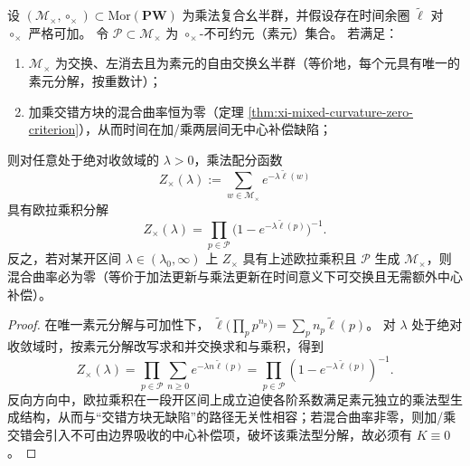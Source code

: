 \begin{theorem}\label{thm:xi-time-euler-product-under-zero-mixed-curvature}
设 \((\mathcal M_\times,\circ_\times)\subset \mathrm{Mor}(\mathbf{PW})\) 为乘法复合幺半群，并假设存在时间余圈 \(\widetilde{\ell}\) 对 \(\circ_\times\) 严格可加。
令 \(\mathcal P\subset\mathcal M_\times\) 为 \(\circ_\times\)-不可约元（素元）集合。
若满足：
\begin{enumerate}
  \item \(\mathcal M_\times\) 为交换、左消去且为素元的自由交换幺半群（等价地，每个元具有唯一的素元分解，按重数计）；
  \item 加乘交错方块的混合曲率恒为零（定理 \ref{thm:xi-mixed-curvature-zero-criterion}），从而时间在加/乘两层间无中心补偿缺陷；
\end{enumerate}
则对任意处于绝对收敛域的 \(\lambda>0\)，乘法配分函数
\[
Z_\times(\lambda):=\sum_{w\in\mathcal M_\times}e^{-\lambda \widetilde{\ell}(w)}
\]
具有欧拉乘积分解
\[
Z_\times(\lambda)=\prod_{p\in\mathcal P}\bigl(1-e^{-\lambda \widetilde{\ell}(p)}\bigr)^{-1}.
\]
反之，若对某开区间 \(\lambda\in(\lambda_0,\infty)\) 上 \(Z_\times\) 具有上述欧拉乘积且 \(\mathcal P\) 生成 \(\mathcal M_\times\)，则混合曲率必为零（等价于加法更新与乘法更新在时间意义下可交换且无需额外中心补偿）。
\end{theorem}

\begin{proof}
在唯一素元分解与可加性下，
\(
\widetilde{\ell}\bigl(\prod_p p^{n_p}\bigr)=\sum_p n_p\widetilde{\ell}(p)
\)。
对 \(\lambda\) 处于绝对收敛域时，按素元分解改写求和并交换求和与乘积，得到
\[
Z_\times(\lambda)
=\prod_{p\in\mathcal P}\sum_{n\ge 0}e^{-\lambda n\widetilde{\ell}(p)}
=\prod_{p\in\mathcal P}(1-e^{-\lambda\widetilde{\ell}(p)})^{-1}.
\]
反向方向中，欧拉乘积在一段开区间上成立迫使各阶系数满足素元独立的乘法型生成结构，从而与“交错方块无缺陷”的路径无关性相容；若混合曲率非零，则加/乘交错会引入不可由边界吸收的中心补偿项，破坏该乘法型分解，故必须有 \(K\equiv 0\)。
\end{proof}

